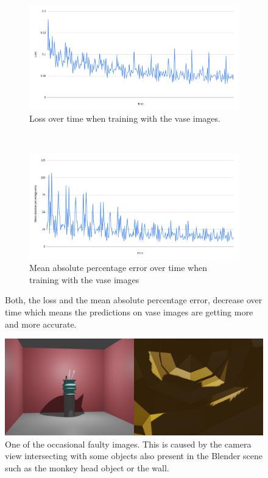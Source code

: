 \begin{figure}[h!]
	\centering
	\begin{subfigure}[t]{0.8\textwidth}
		\centering
		\includegraphics[width=\textwidth]{img/experiment1_results_lossOverTime.png}
		\caption{Loss over time when training with the vase images.}
	\end{subfigure}
	~ 
	\begin{subfigure}[t]{0.8\textwidth}
		\centering
		\includegraphics[width=\textwidth]{img/experiment1_results_MeanAbsolutePercentageErrorOverTime.png}
		\caption{Mean absolute percentage error over time when training with the vase images}
	\end{subfigure}
	\caption{Both, the loss and the mean absolute percentage error, decrease over time which means the predictions on vase images are getting more and more accurate.}
	\label{pic:experiment1_results_loss_and_percentageLoss}
\end{figure}

\begin{figure}[h!]
	\centering
	\includegraphics[width=\textwidth]{img/experiment1_results_faultyImg.jpg}
	\caption{One of the occasional faulty images. This is caused by the camera view intersecting with some objects also present in the Blender scene such as the monkey head object or the wall.}
	\label{pic:experiment1_results_faultyImage}
\end{figure}

